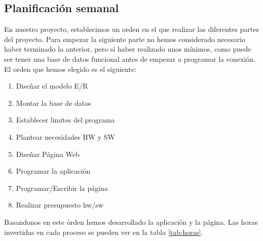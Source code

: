 \documentclass{article}
\begin{document}
\subsection{Planificación semanal}
En nuestro proyecto, establecimos un orden en el que realizar las diferentes partes del proyecto.
Para empezar la siguiente parte no hemos considerado necesario haber terminado la anterior, pero sí haber
realizado unos mínimos, como puede ser tener una base de datos funcional antes de empezar a programar la conexión.\\
El orden que hemos elegido es el siguiente: 
\begin{enumerate}
  \item Diseñar el modelo E/R
  \item Montar la base de datos
  \item Establecer limites del programa
  \item Plantear necesidades HW y SW
  \item Diseñar Página Web 
  \item Programar la aplicación
  \item Programar/Escribir la página
  \item Realizar presupuesto hw/sw
\end{enumerate} 
Basandonos en este órden hemos desarrollado la aplicación y la página. Las horas invertidas en cada proceso
se pueden ver en la tabla \ref{tab:horas}.
\end{document}
